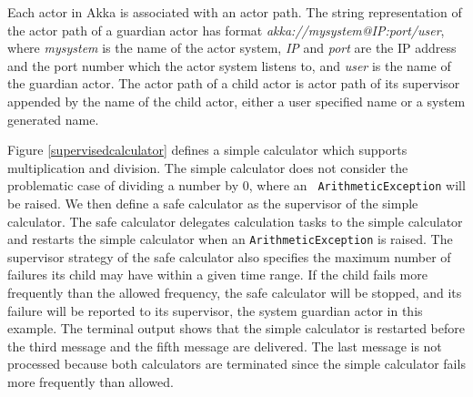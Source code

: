 Each actor in Akka is associated with an actor path.  The string representation
of the actor path of a guardian actor has format 
{\it akka://mysystem@IP:port/user}, where {\it mysystem} is the name of the 
actor system, {\it IP} and {\it port} are the IP address and the 
port number which the actor system listens to, and {\it user} is the name of 
the guardian actor.  The actor path of a child actor is actor path of its 
supervisor appended by the name of the child actor, either a user specified 
name or a system generated name.

Figure \ref{supervisedcalculator} defines a simple calculator which supports
multiplication and division. The simple calculator does not consider the
problematic case of dividing a number by 0, where an {\tt
ArithmeticException} will be raised.  We then define a safe calculator as the 
supervisor of the simple calculator.  The safe calculator delegates 
calculation tasks to the simple calculator and restarts the simple calculator 
when an {\tt ArithmeticException} is raised.  The supervisor strategy of
the safe calculator also specifies the maximum number of failures its child may 
have within a given time range.  If the child fails more frequently than the 
allowed frequency, the safe calculator will be  stopped, and its failure will be
reported to its supervisor, the system guardian actor in this example.  The
terminal output shows that the simple calculator is restarted before the third 
message and the fifth message are delivered.  The last message is not processed
because both calculators are terminated since the simple calculator fails more 
frequently than allowed.

